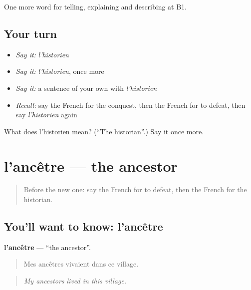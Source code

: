 \begin{grammarlens}[title={What you've built}]
One more word for telling, explaining and describing at B1.
\end{grammarlens}

\subsection*{Your turn}
\begin{itemize}
\raggedright
  \item \emph{Say it:} \emph{l'historien}
  \item \emph{Say it:} \emph{l'historien}, once more
  \item \emph{Say it:} a sentence of your own with \emph{l'historien}
  \item \emph{Recall:} say the French for the conquest, then the French for to defeat, then say \emph{l'historien} again
\end{itemize}

\begin{tcolorbox}[breakable,colback=teal!4,colframe=teal!35!black,title={Before you move on}]
What does l'historien mean? (\textquotedblleft{}The historian\textquotedblright{}.) Say it once more.
\end{tcolorbox}
\section[l'ancêtre]{l'ancêtre — the ancestor}

\label{lesson:FR-C325-ancetre}



\begin{quote}
Before the new one: say the French for to defeat, then the French for the historian.
\end{quote}

\subsection*{You'll want to know: l'ancêtre}
\textbf{l'ancêtre} — \textquotedblleft{}the ancestor\textquotedblright{}.

\begin{quote}
Mes ancêtres vivaient dans ce village.
\end{quote}

\begin{quote}
\emph{My ancestors lived in this village.}
\end{quote}

